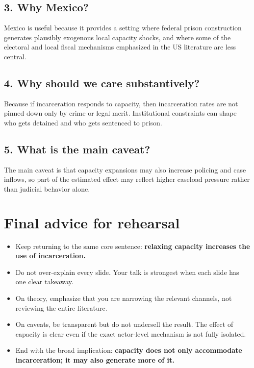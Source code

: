 \documentclass[11pt]{article}
\begin{document}
\subsection*{3. Why Mexico?}
Mexico is useful because it provides a setting where federal prison construction generates plausibly exogenous local capacity shocks, and where some of the electoral and local fiscal mechanisms emphasized in the US literature are less central.

\subsection*{4. Why should we care substantively?}
Because if incarceration responds to capacity, then incarceration rates are not pinned down only by crime or legal merit. Institutional constraints can shape who gets detained and who gets sentenced to prison.

\subsection*{5. What is the main caveat?}
The main caveat is that capacity expansions may also increase policing and case inflows, so part of the estimated effect may reflect higher caseload pressure rather than judicial behavior alone.

\section{Final advice for rehearsal}
\begin{itemize}[leftmargin=1.5em]
    \item Keep returning to the same core sentence: \textbf{relaxing capacity increases the use of incarceration.}
    \item Do not over-explain every slide. Your talk is strongest when each slide has one clear takeaway.
    \item On theory, emphasize that you are narrowing the relevant channels, not reviewing the entire literature.
    \item On caveats, be transparent but do not undersell the result. The effect of capacity is clear even if the exact actor-level mechanism is not fully isolated.
    \item End with the broad implication: \textbf{capacity does not only accommodate incarceration; it may also generate more of it.}
\end{itemize}
\end{document}
